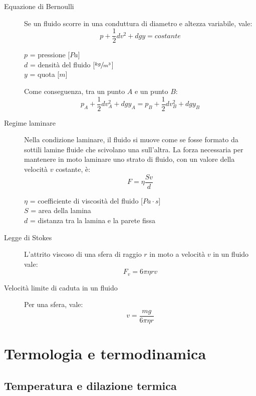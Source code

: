 \documentclass[a4paper,11pt,italian]{article}
\begin{document}
\begin{description}
  \item[Equazione di Bernoulli] Se un fluido scorre in una conduttura di diametro e altezza variabile, vale:
  \[ p + \frac{1}{2}dv^2 + dgy = costante \]
  \begin{multicols}{2}
  $ p $ = pressione [$ Pa $]\\
  $ d $ = densità del fluido [$ \sfrac{kg}{m^3} $]\\
  $ y $ = quota [$ m $]
  \end{multicols}
  
  Come conseguenza, tra un punto $ A $ e un punto $ B $:
  \[ p_A + \frac{1}{2}dv_A^2 + dgy_A = p_B + \frac{1}{2}dv_B^2 + dgy_B \]
  
  \item[Regime laminare] Nella condizione laminare, il fluido si muove come se fosse formato da sottili lamine fluide che scivolano una sull’altra. La forza necessaria per mantenere in moto laminare uno strato di fluido, con un valore della velocità $ v $ costante, è:
  \[ F = \eta\frac{Sv}{d} \]
  \begin{multicols}{2}
  $ \eta $ = coefficiente di viscosità del fluido [$ Pa\cdot s $]\\
  $ S $ = area della lamina\\
  $ d $ = distanza tra la lamina e la parete fissa
  \end{multicols}
  
  \item[Legge di Stokes] L'attrito viscoso di una sfera di raggio $ r $ in moto a velocità $ v $ in un fluido vale:
  \[ F_v = 6 \pi \eta r v \]
  
  \item[Velocità limite di caduta in un fluido] Per una sfera, vale:
  \[ v = \frac{mg}{6 \pi \eta r} \]
\end{description}

\newpage
\section{Termologia e termodinamica}

\subsection{Temperatura e dilazione termica}
\end{document}

